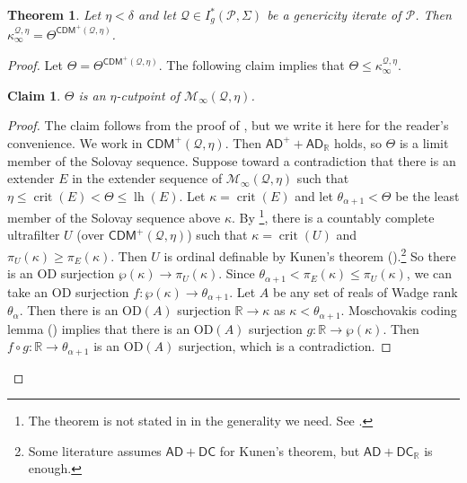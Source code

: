 \documentclass{amsart}
\newtheorem{thm}[dfn]{Theorem}
\newtheorem{claim}{Claim}[dfn]
\newcommand{\power}{\wp}
\DeclareMathOperator{\crit}{crit}
\DeclareMathOperator{\lh}{lh}
\begin{document}
\begin{thm}\label{value_of_Theta}
Let $\eta<\delta$ and let $\mathcal{Q}\in I^*_g(\mathcal{P}, \Sigma)$ be a genericity iterate of $\mathcal{P}$.
Then $\kappa^{\mathcal{Q}, \eta}_{\infty}=\Theta^{\mathsf{CDM}^{+}(\mathcal{Q}, \eta)}$.
\end{thm}
\begin{proof}
    Let $\Theta=\Theta^{\mathsf{CDM}^{+}(\mathcal{Q}, \eta)}$.
    The following claim implies that $\Theta\leq\kappa^{\mathcal{Q}, \eta}_{\infty}$.
    \begin{claim}
        $\Theta$ is an $\eta$-cutpoint of $\mathcal{M}_{\infty}(\mathcal{Q}, \eta)$.
    \end{claim}
    \begin{proof}
        The claim follows from the proof of \cite[Theorem 1.7]{char_of_ext_in_HOD}, but we write it here for the reader's convenience.
        We work in $\mathsf{CDM}^{+}(\mathcal{Q}, \eta)$.
        Then $\mathsf{AD}^+ +\mathsf{AD}_{\mathbb{R}}$ holds, so $\Theta$ is a limit member of the Solovay sequence.
        Suppose toward a contradiction that there is an extender $E$ in the extender sequence of $\mathcal{M}_{\infty}(\mathcal{Q}, \eta)$ such that $\eta\leq\crit(E)<\Theta\leq\lh(E)$. Let $\kappa=\crit(E)$ and let $\theta_{\alpha+1}<\Theta$ be the least member of the Solovay sequence above $\kappa$. By \cite[Theorem 1.5]{char_of_ext_in_HOD}\footnote{The theorem is not stated in \cite{char_of_ext_in_HOD} in the generality we need. See \cite[Theorem 0.3]{Suslin_and_cutpoints}.}, there is a countably complete ultrafilter $U$ (over $\mathsf{CDM}^+(\mathcal{Q}, \eta)$) such that $\kappa=\crit(U)$ and $\pi_{U}(\kappa)\geq\pi_{E}(\kappa)$.
        Then  $U$ is ordinal definable by Kunen's theorem (\cite[Theorem 7.6]{St09}).\footnote{Some literature assumes $\mathsf{AD}+\mathsf{DC}$ for Kunen's theorem, but $\mathsf{AD}+\mathsf{DC}_{\mathbb{R}}$ is enough.}
        So there is an OD surjection $\power(\kappa)\to\pi_{U}(\kappa)$.
        Since $\theta_{\alpha+1}<\pi_{E}(\kappa)\leq\pi_{U}(\kappa)$, we can take an OD surjection $f\colon\power(\kappa)\to\theta_{\alpha+1}$.
        Let $A$ be any set of reals of Wadge rank $\theta_{\alpha}$.
        Then there is an $\mathrm{OD}(A)$ surjection $\mathbb{R}\to\kappa$ as $\kappa<\theta_{\alpha+1}$.
        Moschovakis coding lemma (\cite[Section 7D]{Mo09}) implies that there is an $\mathrm{OD}(A)$ surjection $g\colon\mathbb{R}\to\power(\kappa)$.
        Then $f\circ g\colon\mathbb{R}\to\theta_{\alpha+1}$ is an $\mathrm{OD}(A)$ surjection, which is a contradiction.

\end{proof}
\end{proof}
\end{document}
